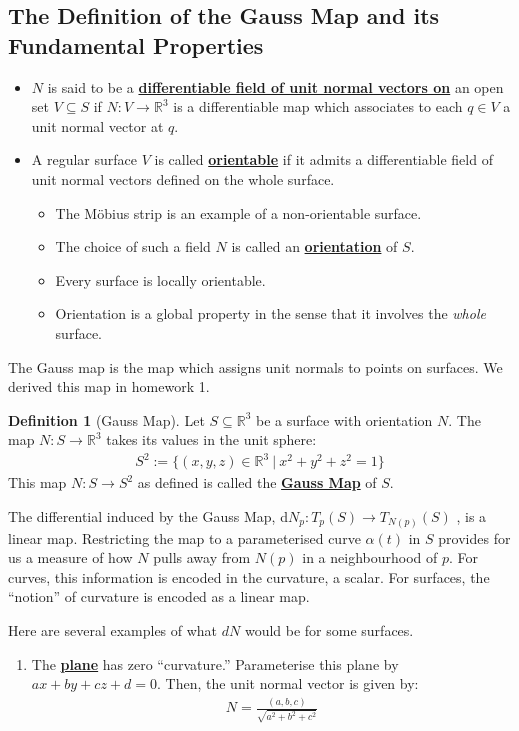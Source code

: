 \documentclass[11pt]{scrartcl}
\newcommand{\R}[0]{\mathbb{R}}
\theoremstyle{definition}
\newtheorem{definition}{Definition}
\theoremstyle{remark}
\newcommand{\dfn}[1]{\textbf{\underline{#1}}}
\begin{document}
{\subsection{The Definition of the Gauss Map and its Fundamental Properties}

\begin{itemize}[noitemsep]
	\item $N$ is said to be a \dfn{differentiable field of unit normal vectors on} an open set $V \subseteq S$ if $N: V \rightarrow \R^3$ is a differentiable map which associates to each $q \in V$ a unit normal vector at $q$. 
	\item A regular surface $V$ is called \dfn{orientable} if it admits a differentiable field of unit normal vectors defined on the whole surface. 
	\begin{itemize}[noitemsep]
		\item The Möbius strip is an example of a non-orientable surface. 
		\item The choice of such a field $N$ is called an \dfn{orientation} of $S$. 
		\item Every surface is locally orientable. 
		\item Orientation is a global property in the sense that it involves the \emph{whole} surface. 
	\end{itemize}
\end{itemize}

The Gauss map is the map which assigns unit normals to points on surfaces. We derived this map in homework 1. 

\begin{definition}[Gauss Map] 
	Let $S \subseteq \R^3$ be a surface with orientation $N$. The map $N: S \rightarrow \R^3$ takes its values in the unit sphere: 
	\begin{align}
		S^2 := \{ (x,y,z) \in \R^3\ |\ x^2 + y^2 + z^2 = 1 \} 	
	\end{align}
	This map $N: S \rightarrow S^2$ as defined is called the \dfn{Gauss Map} of $S$. 
\end{definition}
The differential induced by the Gauss Map, d$N_p: T_p(S) \rightarrow T_{N(p)}(S)$ , is a linear map. Restricting the map to a parameterised curve $\alpha(t)$ in $S$ provides for us a measure of how $N$ pulls away from $N(p)$ in a neighbourhood of $p$. For curves, this information is encoded in the curvature, a scalar. For surfaces, the ``notion'' of curvature is encoded as a linear map. 

Here are several examples of what $dN$ would be for some surfaces. 
\begin{enumerate}[noitemsep]
	\item The \dfn{plane} has zero ``curvature.'' Parameterise this plane by $ax + by + cz + d =0$. Then, the unit normal vector is given by: 
	\begin{align*}
		N = \frac{(a,b,c)}{\sqrt{a^2 + b^2 + c^2}}
	\end{align*}
\end{enumerate}



}
\end{document}
